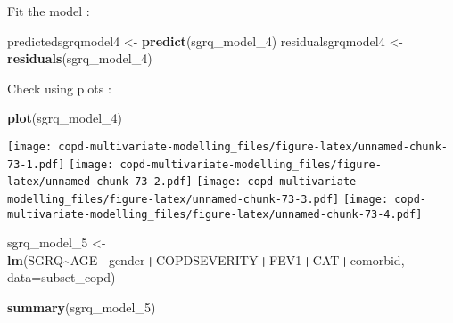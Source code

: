 \documentclass[
]{article}
\newenvironment{Shaded}{\begin{snugshade}}{\end{snugshade}}
\newcommand{\AttributeTok}[1]{\textcolor[rgb]{0.13,0.29,0.53}{#1}}
\newcommand{\FunctionTok}[1]{\textcolor[rgb]{0.13,0.29,0.53}{\textbf{#1}}}
\newcommand{\NormalTok}[1]{#1}
\newcommand{\OtherTok}[1]{\textcolor[rgb]{0.56,0.35,0.01}{#1}}
\newcommand{\SpecialCharTok}[1]{\textcolor[rgb]{0.81,0.36,0.00}{\textbf{#1}}}
\begin{document}
Fit the model :

\begin{Shaded}
\begin{Highlighting}[]
\NormalTok{predictedsgrqmodel4 }\OtherTok{\textless{}{-}} \FunctionTok{predict}\NormalTok{(sgrq\_model\_4)}
\NormalTok{residualsgrqmodel4 }\OtherTok{\textless{}{-}} \FunctionTok{residuals}\NormalTok{(sgrq\_model\_4)}
\end{Highlighting}
\end{Shaded}

Check using plots :

\begin{Shaded}
\begin{Highlighting}[]
\FunctionTok{plot}\NormalTok{(sgrq\_model\_4)}
\end{Highlighting}
\end{Shaded}

\texttt{[image: copd-multivariate-modelling\_files/figure-latex/unnamed-chunk-73-1.pdf]}
\texttt{[image: copd-multivariate-modelling\_files/figure-latex/unnamed-chunk-73-2.pdf]}
\texttt{[image: copd-multivariate-modelling\_files/figure-latex/unnamed-chunk-73-3.pdf]}
\texttt{[image: copd-multivariate-modelling\_files/figure-latex/unnamed-chunk-73-4.pdf]}

\begin{Shaded}
\begin{Highlighting}[]
\NormalTok{sgrq\_model\_5 }\OtherTok{\textless{}{-}} \FunctionTok{lm}\NormalTok{(SGRQ}\SpecialCharTok{\textasciitilde{}}\NormalTok{AGE}\SpecialCharTok{+}\NormalTok{gender}\SpecialCharTok{+}\NormalTok{COPDSEVERITY}\SpecialCharTok{+}\NormalTok{FEV1}\SpecialCharTok{+}\NormalTok{CAT}\SpecialCharTok{+}\NormalTok{comorbid, }\AttributeTok{data=}\NormalTok{subset\_copd)}
\end{Highlighting}
\end{Shaded}

\begin{Shaded}
\begin{Highlighting}[]
\FunctionTok{summary}\NormalTok{(sgrq\_model\_5)}
\end{Highlighting}
\end{Shaded}
\end{document}
